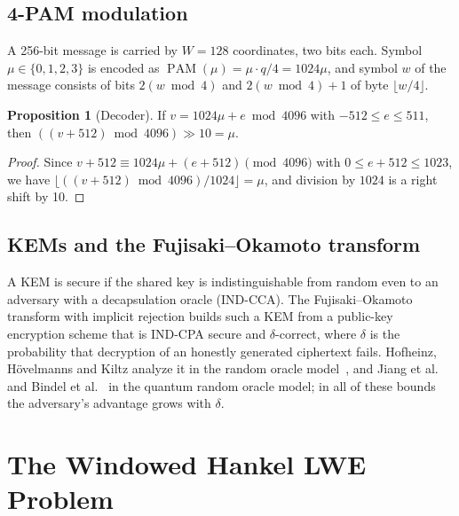 \documentclass[11pt,a4paper]{article}
\theoremstyle{definition}
\newtheorem{proposition}{Proposition}
\newcommand{\PAM}{\operatorname{PAM}}
\begin{document}
\subsection{4-PAM modulation}
A 256-bit message is carried by $W = 128$ coordinates, two bits each. Symbol $\mu \in \{0,1,2,3\}$ is encoded as $\PAM(\mu) = \mu \cdot q/4 = 1024\mu$, and symbol $w$ of the message consists of bits $2(w \bmod 4)$ and $2(w \bmod 4) + 1$ of byte $\lfloor w/4 \rfloor$.

\begin{proposition}[Decoder]\label{prop:decoder}
If $v = 1024\mu + e \bmod 4096$ with $-512 \le e \le 511$, then $((v + 512) \bmod 4096) \gg 10 = \mu$.
\end{proposition}
\begin{proof}
Since $v + 512 \equiv 1024\mu + (e + 512) \pmod{4096}$ with $0 \le e + 512 \le 1023$, we have $\lfloor ((v+512) \bmod 4096)/1024 \rfloor = \mu$, and division by $1024$ is a right shift by 10.
\end{proof}

\subsection{KEMs and the Fujisaki--Okamoto transform}
A KEM is secure if the shared key is indistinguishable from random even to an adversary with a decapsulation oracle (IND-CCA). The Fujisaki--Okamoto transform with implicit rejection builds such a KEM from a public-key encryption scheme that is IND-CPA secure and $\delta$-correct, where $\delta$ is the probability that decryption of an honestly generated ciphertext fails. Hofheinz, H\"ovelmanns and Kiltz analyze it in the random oracle model~\cite{hhk2017modular}, and Jiang et al.~\cite{jiang2018qrom} and Bindel et al.~\cite{bindel2019tighter} in the quantum random oracle model; in all of these bounds the adversary's advantage grows with $\delta$.

\section{The Windowed Hankel LWE Problem}\label{sec:problem}
\end{document}
